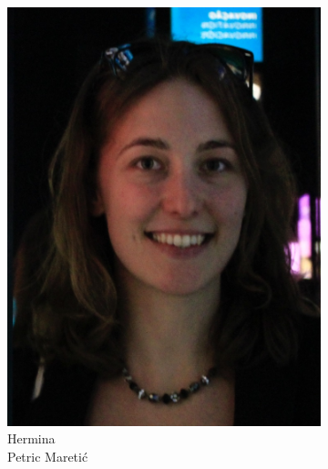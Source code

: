 \documentclass[aspectratio=169]{beamer}
\begin{document}
\begin{frame}
\begin{figure}
\begin{subfigure}[b]{0.14\linewidth}
			\includegraphics[width=\linewidth]{picture_hermina}
			\caption*{Hermina\\Petric Maretić}
		\end{subfigure}
		\hfill
		\begin{subfigure}[b]{0.14\linewidth}

\end{subfigure}
\end{figure}
\end{frame}
\end{document}
